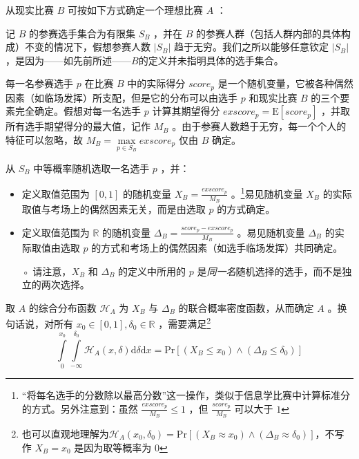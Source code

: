             \begin{definition}
                从现实比赛 $B$ 可按如下方式确定一个理想比赛 $A$ ：

                \begin{asparaenum}[\bfseries{步骤} 1.]
                    \item 记 $B$ 的参赛选手集合为有限集 $S_B$ ，并在 $B$ 的参赛人群（包括人群内部的具体构成）不变的情况下，假想参赛人数 $\left|S_B\right|$ 趋于无穷。我们之所以能够任意钦定 $\left|S_B\right|$ ，是因为——如先前所述——$B$的定义并未指明具体的选手集合。
                    \item \label{step:realToIdealStep2} 每一名参赛选手 $p$ 在比赛 $B$ 中的实际得分 $\textit{score}_p$ 是一个随机变量，它被各种偶然因素（如临场发挥）所支配，但是它的分布可以由选手 $p$ 和现实比赛 $B$ 的三个要素完全确定。假想对每一名选手 $p$ 计算其期望得分 $\textit{exscore}_p=\mathrm{E}\left[\textit{score}_p\right]$ ，并取所有选手期望得分的最大值，记作 $M_B$ 。由于参赛人数趋于无穷，每一个个人的特征可以忽略，故 $M_B=\max\limits_{p\in S_B} \textit{exscore}_p$ 仅由 $B$ 确定。
                    \item \label{step:realToIdealStep3} 从 $S_B$ 中等概率随机选取一名选手 $p$ ，并：
                    \begin{itemize}[leftmargin=4em]
                        \item 定义取值范围为 $[0,1]$ 的随机变量 $X_B=\frac{\textit{exscore}_p}{M_B}$ 。\footnote{“将每名选手的分数除以最高分数”这一操作，类似于信息学比赛中计算标准分的方式。另外注意到：虽然 $\frac{\textit{exscore}_p}{M_B}\leq 1$ ，但 $\frac{\textit{score}_p}{M_B}$ 可以大于 $1$ }易见随机变量 $X_B$ 的实际取值与考场上的偶然因素无关，而是由选取 $p$ 的方式确定。
                        \item 定义取值范围为 $\mathbb{R}$ 的随机变量 $\Delta_B=\frac{\textit{score}_p-\textit{exscore}_p}{M_B}$ 。易见随机变量 $\Delta_B$ 的实际取值由选取 $p$ 的方式和考场上的偶然因素（如选手临场发挥）共同确定。
                        \item [◦] 请注意，$X_B$ 和 $\Delta_B$ 的定义中所用的 $p$ 是\emph{同一名}随机选择的选手，而不是独立的两次选择。
                    \end{itemize}
                    \item 取 $A$ 的综合分布函数 $\mathcal{H}_A$ 为 $X_B$ 与 $\Delta_B$ 的联合概率密度函数，从而确定 $A$ 。换句话说，对所有 $x_0\in[0,1],\delta_0\in\mathbb{R}$ ，需要满足\footnote{也可以直观地理解为$\mathcal{H}_A(x_0,\delta_0)=\mathrm{Pr}\left[\left(X_B\approx x_0\right)\land\left(\Delta_B\approx\delta_0\right)\right]$，不写作 $X_B=x_0$ 是因为取等概率为 $0$ }
                    \begin{equation}
                        \int\limits_0^{x_0}\int\limits_{-\infty}^{\delta_0} \mathcal{H}_A(x,\delta)\mathrm{d}\delta\mathrm{d}x=\mathrm{Pr}\left[\left(X_B\leq x_0\right)\land\left(\Delta_B\leq\delta_0\right)\right]
                        \label{formula:definitionOfJointDensityFunction}
                    \end{equation}


\end{asparaenum}
\end{definition}
